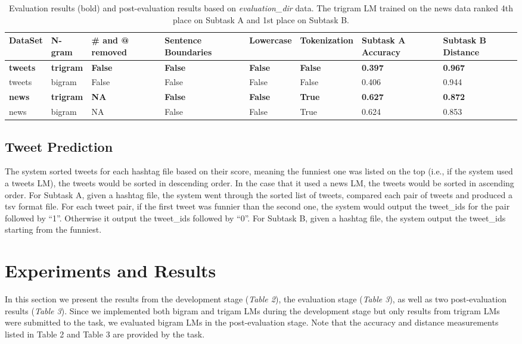 \documentclass[11pt,a4paper]{article}
\begin{document}
\begin{table*}[h!]
\centering
\begin{tabular}{ |p{1.2cm}|p{1.2cm}|p{1.2cm}|p{1.7cm}|p{1.5cm}|p{1.9cm}|p{1.7cm}|p{1.7cm}|}
\hline
DataSet & N-gram & \# and @ removed  & Sentence Boundaries & Lowercase & Tokenization & Subtask A Accuracy & Subtask B Distance \\
\hline
\textbf{tweets} & \textbf{trigram} & \textbf{False} & \textbf{False} & \textbf{False} & \textbf{False} & \textbf{0.397} & \textbf{0.967} \\
\hline
tweets & bigram & False & False & False & False & 0.406 & 0.944 \\
\hline
\textbf{news} & \textbf{trigram} & \textbf{NA} & \textbf{False} & \textbf{False} & \textbf{True} & \textbf{0.627} & \textbf{0.872} \\
\hline
news & bigram & NA & False & False & True & 0.624 & 0.853 \\
\hline
\end{tabular}
\caption{Evaluation results (bold) and post-evaluation results based on \textit{evaluation\_dir} data. The trigram LM trained on the news data ranked 4th place on Subtask A and 1st place on Subtask B.}
\label{table:3}
\end{table*}

\subsection{Tweet Prediction}
The system sorted tweets for each hashtag file based on their score, meaning the funniest one was listed on the top (i.e., if the system used a tweets LM), the tweets would be sorted in descending order. In the case that it used a news LM, the tweets would be sorted in ascending order. For Subtask A, given a hashtag file, the system went through the sorted list of tweets, compared each pair of tweets and produced a tsv format file. For each tweet pair, if the first tweet was funnier than the second one, the system would output the tweet\_ids for the pair followed by ``1''. Otherwise it output the tweet\_ids followed by ``0''. For Subtask B, given a hashtag file, the system output the tweet\_ids starting from the funniest.


\section{Experiments and Results}
In this section we present the results from the development stage (\textit{Table 2}), the evaluation stage (\textit{Table 3}), as well as two post-evaluation results (\textit{Table 3}). Since we implemented both bigram and trigam LMs during the development stage but only results from trigram LMs were submitted to the task, we evaluated bigram LMs in the post-evaluation stage. Note that the accuracy and distance measurements listed in Table 2 and Table 3 are provided by the task. 
\end{document}
